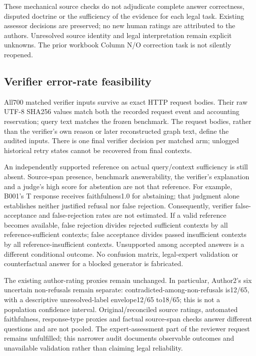 These mechanical source checks do not adjudicate complete answer correctness, disputed doctrine or the sufficiency of the evidence for each legal task. Existing assessor decisions are preserved; no new human ratings are attributed to the authors. Unresolved source identity and legal interpretation remain explicit unknowns. The prior workbook Column N/O correction task is not silently reopened.

\subsection{Verifier error-rate feasibility}
All700 matched verifier inputs survive as exact HTTP request bodies. Their raw UTF-8 SHA256 values match both the recorded request event and accounting reservation; query text matches the frozen benchmark. The request bodies, rather than the verifier's own reason or later reconstructed graph text, define the audited inputs. There is one final verifier decision per matched arm; unlogged historical retry states cannot be recovered from final contexts.

An independently supported reference on actual query/context sufficiency is still absent. Source-span presence, benchmark answerability, the verifier's explanation and a judge's high score for abstention are not that reference. For example, B001's T response receives faithfulness1.0 for abstaining; that judgment alone establishes neither justified refusal nor false rejection. Consequently, verifier false-acceptance and false-rejection rates are not estimated. If a valid reference becomes available, false rejection divides rejected sufficient contexts by all reference-sufficient contexts; false acceptance divides passed insufficient contexts by all reference-insufficient contexts. Unsupported among accepted answers is a different conditional outcome. No confusion matrix, legal-expert validation or counterfactual answer for a blocked generator is fabricated.

The existing author-rating proxies remain unchanged. In particular, Author2's six uncertain non-refusals remain separate: contradicted-among-non-refusals is12/65, with a descriptive unresolved-label envelope12/65 to18/65; this is not a population confidence interval. Original/reconciled source ratings, automated faithfulness, response-type proxies and factual source-span checks answer different questions and are not pooled. The expert-assessment part of the reviewer request remains unfulfilled; this narrower audit documents observable outcomes and unavailable validation rather than claiming legal reliability.
